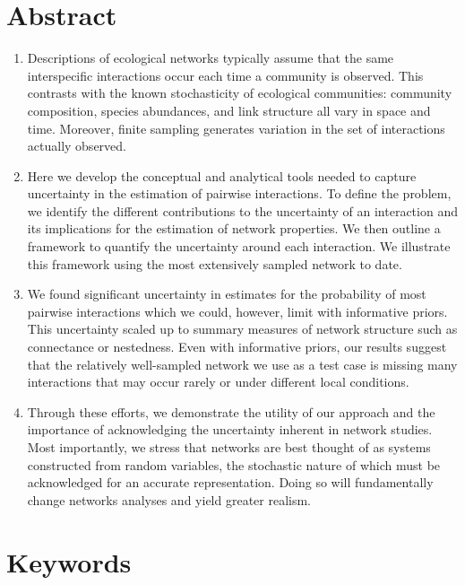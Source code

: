 \documentclass[12pt]{article}
\begin{document}
\begin{spacing}{2.0}

\section*{Abstract}

  \begin{enumerate}

    \item  Descriptions of ecological networks typically assume that the same interspecific interactions occur each time a community is observed. This contrasts with the known stochasticity of ecological communities: community composition, species abundances, and link structure all vary in space and time. Moreover, finite sampling generates variation in the set of interactions actually observed. 
    \item Here we develop the conceptual and analytical tools needed to capture uncertainty in the estimation of pairwise interactions. To define the problem, we identify the different contributions to the uncertainty of an interaction and its implications for the estimation of network properties. We then outline a framework to quantify the uncertainty around each interaction. We illustrate this framework using the most extensively sampled network to date. 
    \item We found significant uncertainty in estimates for the probability of most pairwise interactions which we could, however, limit with informative priors. This uncertainty scaled up to summary measures of network structure such as connectance or nestedness. Even with informative priors, our results suggest that the relatively well-sampled network we use as a test case is missing many interactions that may occur rarely or under different local conditions. 
    \item Through these efforts, we demonstrate the utility of our approach and the importance of acknowledging the uncertainty inherent in network studies. Most importantly, we stress that networks are best thought of as systems constructed from random variables, the stochastic nature of which must be acknowledged for an accurate representation. Doing so will fundamentally change networks analyses and yield greater realism.
\end{enumerate}


\section*{\small Keywords}


\end{spacing}
\end{document}
